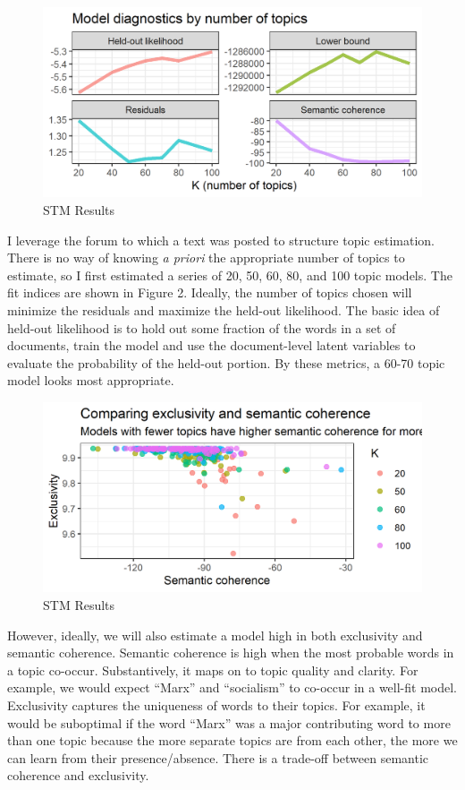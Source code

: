 \documentclass[12pt]{paper}
\begin{document}
\begin{figure} \centering
	\includegraphics[width=.8\linewidth]{figs/diagnostics-by-topic.png}
	\caption{STM Results}
	\label{}
\end{figure}

I leverage the forum to which a text was posted to structure topic estimation. There is no way of knowing \textit{a priori} the appropriate number of topics to estimate, so I first estimated a series of 20, 50, 60, 80, and 100 topic models. The fit indices are shown in Figure 2. Ideally, the number of topics chosen will minimize the residuals and maximize the held-out likelihood. The basic idea of held-out likelihood is to hold out some fraction of the words in a set of documents, train the model and use the document-level latent variables to evaluate the probability of the held-out portion. By these metrics, a 60-70 topic model looks most appropriate. 

\begin{figure} \centering
	\includegraphics[width=.8\linewidth]{figs/exclusivity-vs-semantics.png}
	\caption{STM Results}
	\label{}
\end{figure}

However, ideally, we will also estimate a model high in both exclusivity and semantic coherence. Semantic coherence is high when the most probable words in a topic co-occur. Substantively, it maps on to topic quality and clarity. For example, we would expect ``Marx” and ``socialism” to co-occur in a well-fit model. Exclusivity captures the uniqueness of words to their topics. For example, it would be suboptimal if the word ``Marx” was a major contributing word to more than one topic because the more separate topics are from each other, the more we can learn from their presence/absence. There is a trade-off between semantic coherence and exclusivity.
\end{document}
